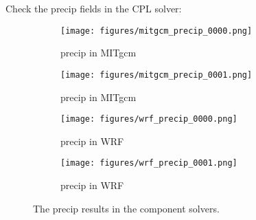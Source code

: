 
Check the precip fields in the CPL solver:

\begin{figure}[h!]
\centering
  \begin{subfigure}[b]{0.45\linewidth}
  \texttt{[image: figures/mitgcm\_precip\_0000.png]}
  \caption{precip in MITgcm}
  \end{subfigure}
  \begin{subfigure}[b]{0.45\linewidth}
  \texttt{[image: figures/mitgcm\_precip\_0001.png]}
  \caption{precip in MITgcm}
  \end{subfigure}
  \hspace{0.1in}
  \begin{subfigure}[b]{0.45\linewidth}
  \texttt{[image: figures/wrf\_precip\_0000.png]}
  \caption{precip in WRF}
  \end{subfigure}
  \begin{subfigure}[b]{0.45\linewidth}
  \texttt{[image: figures/wrf\_precip\_0001.png]}
  \caption{precip in WRF}
  \end{subfigure}
\caption{The precip results in the component solvers.}
\label{fig:q2}
\end{figure}
